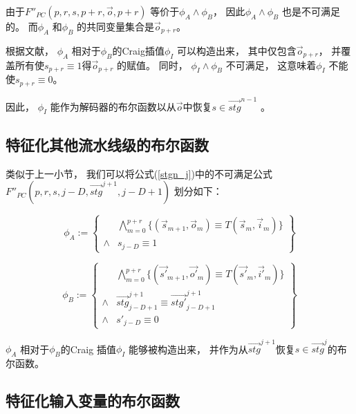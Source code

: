 由于$F''_{PC}(p,r,s,p+r,\vec{o},p+r)$ 等价于$\phi_A \wedge \phi_B$，
因此$\phi_A \wedge \phi_B$ 也是不可满足的。
而$\phi_A$ 和$\phi_B$ 的共同变量集合是$\vec{o}_{p+r}$。

根据文献，
$\phi_A$ 相对于$\phi_B$的Craig插值$\phi_I$  可以构造出来，
其中仅包含$\vec{o}_{p+r}$，
并覆盖所有使$s_{p+r}\equiv 1$得$\vec{o}_{p+r}$ 的赋值。
同时，
$\phi_I\wedge \phi_B$  不可满足，
这意味着$\phi_I$ 不能使$s_{p+r}\equiv 0$。

因此，
$\phi_I$ 能作为解码器的布尔函数以从$\vec{o}$中恢复$s\in \vec{stg}^{n-1}$ 。

\subsection{特征化其他流水线级的布尔函数}
类似于上一小节，
我们可以将公式(\ref{stgn_j})中的不可满足公式$F''_{PC}(p,r,s,j-D,\vec{stg}^{j+1},j-D+1)$
划分如下：

\begin{equation}
 \phi_A :=
 \left\{
\begin{array}{cc}
&\bigwedge_{m=0}^{p+r}
\{
(\vec{s}_{m+1},\vec{o}_m)\equiv T(\vec{s}_m,\vec{i}_m)
\}
\\
\wedge& s_{j-D}\equiv 1
\end{array}
\right\}
\end{equation}

\begin{equation}
\phi_B :=
\left\{
\begin{array}{cc}
&\bigwedge_{m=0}^{p+r}
\{
(\vec{s'}_{m+1},\vec{o'}_m)\equiv T(\vec{s'}_m,\vec{i'}_m)
\}
\\
\wedge&\vec{stg}^{j+1}_{j-D+1}\equiv \vec{stg'}^{j+1}_{j-D+1} \\
\wedge& s'_{j-D}\equiv 0
\end{array}
\right\}
\end{equation}

$\phi_A$ 相对于$\phi_B$的Craig 插值$\phi_I$  能够被构造出来，
并作为从$\vec{stg}^{j+1}$恢复$s\in \vec{stg}^{j}$的布尔函数。

\subsection{特征化输入变量的布尔函数}

